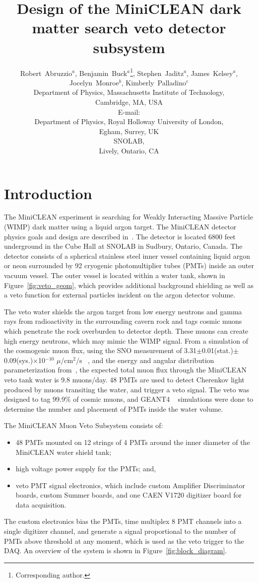 \documentclass{JINST}
\title{Design of the MiniCLEAN dark matter search veto detector subsystem}
\author{Robert~Abruzzio$^a$, Benjamin~Buck$^a$\thanks{Corresponding author.}, Stephen~Jaditz$^a$, James~Kelsey$^a$, Jocelyn~Monroe$^{b}$, Kimberly~Palladino$^{c}$\\
\llap{$^a$}Department of Physics, Massachusetts Institute of Technology,\\
	Cambridge, MA, USA\\
	E-mail: \email{bbuck@mit.edu}\\
\llap{$^b$}Department of Physics, Royal Holloway University of London,\\
	Egham, Surrey, UK \\
\llap{$^c$}SNOLAB, \\ 
        Lively, Ontario, CA}
\begin{document}
\section{Introduction}
\label{Introduction}
The MiniCLEAN experiment is searching for Weakly Interacting Massive Particle
(WIMP) dark matter using a liquid argon target.  The MiniCLEAN detector
physics goals and design are described in~\cite{ref:miniclean_physics}.  The
detector is located 6800 feet underground in the Cube Hall at SNOLAB in
Sudbury, Ontario, Canada.  The detector consists of a spherical stainless
steel inner vessel containing liquid argon or neon surrounded by 92 cryogenic
photomultiplier tubes (PMTs) inside an outer vacuum vessel. The outer vessel
is located within a water tank, shown in Figure~\ref{fig:veto_geom}, which
provides additional background shielding as well as a veto function for
external particles incident on the argon detector volume.  

The veto water shields the argon target from low energy neutrons and gamma
rays from radioactivity in the surrounding cavern rock and tags cosmic muons
which penetrate the rock overburden to detector depth.  These muons can
create high energy neutrons, which may mimic the WIMP signal.
From a simulation of the cosmogenic muon flux, using the SNO measurement of
3.31$\pm$0.01(stat.)$\pm$0.09(sys.)$\times$10$^{-10}$ $\mu$/cm$^2$/s
~\cite{ref:sno_muon_flux}, and the energy and angular distribution
parameterization from~\cite{ref:mei_and_hime}, the expected total muon flux
through the MiniCLEAN veto tank water is 9.8 muons/day.  48 PMTs are used to
detect Cherenkov light produced by muons transiting the water, and trigger a
veto signal.  The veto was designed to tag 99.9\% of cosmic muons, and GEANT4
~\cite{ref:geant4} simulations were done to determine the number and placement
of PMTs inside the water volume.  

The MiniCLEAN Muon Veto Subsystem consists of:
\begin{itemize}
\item 48 PMTs mounted on 12 strings of 4 PMTs around the inner diameter of the MiniCLEAN water shield tank;
\item high voltage power supply for the PMTs; and,
\item veto PMT signal electronics, which include custom Amplifier Discriminator boards, custom Summer boards, and one CAEN V1720 digitizer board for data acquisition.  
\end{itemize}
The custom electronics bias the PMTs, time multiplex 8 PMT channels into a
single digitizer channel, and generate a signal proportional to the number
of PMTs above threshold at any moment, which is used as the veto trigger to
the DAQ.  An overview of the system is shown in
Figure~\ref{fig:block_diagram}.
\end{document}
